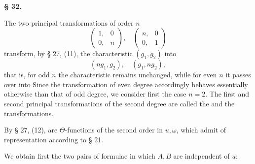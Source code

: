 
\begin{center}
\textbf{§ 32. }
\end{center}

The two principal transformations of order $n$
\[
\begin{pmatrix} 1, & 0 \\ 0, & n \end{pmatrix}, \quad \begin{pmatrix} n, & 0 \\ 0, & 1 \end{pmatrix}
\]
transform, by § 27, (11), the characteristic $(g_1, g_2)$ into
\[
(ng_1, g_2), \quad (g_1, ng_2),
\]
that is, for odd $n$ the characteristic remains unchanged, while for even $n$ it passes over into
Since the transformation of even degree accordingly behaves essentially otherwise than that of odd degree, we consider first the case $n = 2$. The first and second principal transformations of the second degree are called the  and the  transformations.

By § 27, (12),
are $\Theta$-functions of the second order in $u, \omega$, which admit of representation according to § 21.

We obtain first the two pairs of formulae in which $A, B$ are independent of $u$:
